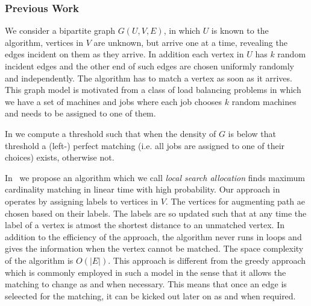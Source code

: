 \documentclass{scrartcl}
\begin{document}
\subsubsection{Previous Work}
We consider a bipartite graph $G(U,V,E)$, in which $U$ is known to the algorithm, vertices in $V$ are
unknown, but arrive one at a time, revealing the edges incident on
them as they arrive. In addition each vertex in $U$ has $k$ random incident edges and the other end of such edges are chosen uniformly randomly and independently. The algorithm has to match a vertex
as soon as it arrives. This graph model is motivated from a class of load balancing problems in which we have a set of machines and jobs where each job chooses $k$ random machines and needs to be assigned to one of them.

In \cite{kCores} we compute a threshold such that when the density of $G$ is below that threshold a (left-) perfect matching (i.e. all jobs are assigned to one of their choices) exists, otherwise not.
%

In~\cite{ballsbins} we propose an algorithm which we call \emph{local search allocation} finds maximum cardinality matching in linear time with high probability.
Our approach in~\cite{ballsbins} operates by assigning labels to vertices in $V$. The vertices for augmenting path ae chosen based on their labels. The labels are so updated such that at any time the label of a vertex is atmost the shortest distance to an unmatched vertex. In addition to the efficiency of the approach, the algorithm never runs in loops and gives the information when the vertex cannot be matched. The space complexity of the algorithm is $O(|E|)$. This approach is different from the greedy approach which is commonly employed in such a model in the sense that it allows the matching to change as and when necessary. This means that once an edge is seleected for the matching, it can be kicked out later on as and when required.
\end{document}

